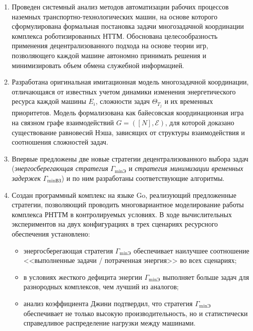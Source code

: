 \begin{enumerate}[beginpenalty=10000, midpenalty=10000, wide=\parindent, leftmargin=0pt]
    \item Проведен системный анализ методов автоматизации рабочих процессов наземных транспортно-технологических машин, на основе которого сформулирована формальная постановка задачи многозадачной координации комплекса роботизированных НТТМ. Обоснована целесообразность применения децентрализованного подхода на основе теории игр, позволяющего каждой машине автономно принимать решения и минимизировать объем обмена служебной информацией.

    \item Разработана оригинальная имитационная модель многозадачной координации, отличающаяся от известных учетом динамики изменения энергетического ресурса каждой машины $ E_i $, сложности задач $ \Theta_{T_j} $ и их временных приоритетов. Модель формализована как байесовская координационная игра на связном графе взаимодействий $ G = ([N],\mathcal{E}) $, для которой доказано существование равновесий Нэша, зависящих от структуры взаимодействия и соотношения сложностей задач.

    \item Впервые предложены две новые стратегии децентрализованного выбора задач (\textit{энергосберегающая стратегия} $ \Gamma_{\min\text{Э}} $ и \textit{стратегия минимизации временных задержек} $ \Gamma_{\min\text{ВЗ}} $) и по ним разработаны соответствующие алгоритмы.

    \item Создан программный комплекс на языке Go, реализующий предложенные стратегии, позволяющий проводить многовариантное моделирование работы комплекса РНТТМ в контролируемых условиях. В ходе вычислительных экспериментов на двух конфигурациях в трех сценариях ресурсного обеспечения установлено:
    \begin{itemize}[beginpenalty=10000, midpenalty=10000, wide=\parindent, leftmargin=0pt]
        \item энергосберегающая стратегия $ \Gamma_{\min\text{Э}} $ обеспечивает наилучшее соотношение <<выполненные задачи / потраченная энергия>> во всех сценариях;
        \item в условиях жесткого дефицита энергии $ \Gamma_{\min\text{Э}} $ выполняет больше задач для разнородных комплексов, чем лучший из аналогов;
        \item анализ коэффициента Джини подтвердил, что стратегия $ \Gamma_{\min\text{Э}} $ обеспечивает не только высокую производительность, но и статистически справедливое распределение нагрузки между машинами.
    \end{itemize}


\end{enumerate}

